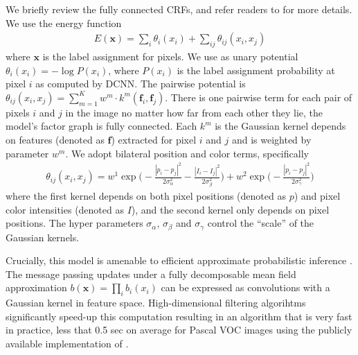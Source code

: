 We briefly review the fully connected CRFs, and refer readers to
\citep{krahenbuhl2011efficient} for more details. We use the energy function
\begin{align}
  E(\boldsymbol{x}) = \sum_i \theta_i(x_i) + \sum_{ij} \theta_{ij}(x_i, x_j)
\end{align}
where $\boldsymbol{x}$ is the label assignment for pixels. We use as unary
potential $\theta_i(x_i) = - \log P(x_i)$, where $P(x_i)$ is the label
assignment probability at pixel $i$ as computed by DCNN. The pairwise
potential is $\theta_{ij}(x_i, x_j) = \sum_{m=1}^{K} w^m \cdot
k^m(\boldsymbol{f}_i, \boldsymbol{f}_j)$. There is one pairwise term for each
pair of pixels $i$ and $j$ in the image no matter how far from each other they
lie, \ie the model's factor graph is fully connected. Each $k^m$ is the
Gaussian kernel depends on features (denoted as $\boldsymbol{f}$) extracted for pixel $i$ and $j$ and is
weighted by parameter $w^m$. We adopt bilateral position and color terms,
specifically
\begin{align}
  \label{eq:fully_crf}
  \theta_{ij}(x_i, x_j) = w^1 \exp \Big(-\frac{|p_i-p_j|^2}{2\sigma_\alpha^2} -\frac{|I_i-I_j|^2}{2\sigma_\beta^2} \Big) + w^2 \exp \Big(-\frac{|p_i-p_j|^2}{2\sigma_\gamma^2}\Big)
\end{align}
where the first kernel depends on both pixel positions (denoted as $p$) and
pixel color intensities (denoted as $I$), and the second kernel only depends
on pixel positions. The hyper parameters $\sigma_\alpha$, $\sigma_\beta$ and
$\sigma_\gamma$ control the ``scale'' of the Gaussian kernels.

Crucially, this model is amenable to efficient approximate probabilistic
inference \citep{krahenbuhl2011efficient}. The message passing updates under a
fully decomposable mean field approximation $b(\boldsymbol{x}) = \prod_i
b_i(x_i)$ can be expressed as convolutions with a Gaussian kernel in feature
space. High-dimensional filtering algorihtms \citep{adams2010fast}
significantly speed-up this computation resulting in an algorithm that is very
fast in practice, less that 0.5 sec on average for Pascal VOC images using the
publicly available implementation of \citep{krahenbuhl2011efficient}.

